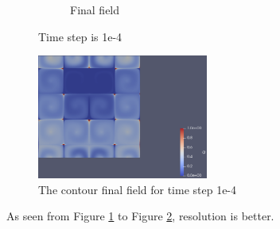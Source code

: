 \documentclass{article}
\begin{document}
\begin{figure}[hbt!]
\begin{subfigure}{0.4\textwidth}
        \caption{Final field}
  \end{subfigure}
  \caption{Time step is 1e-4}
  \label{t1m4_1} 
\end{figure}

\begin{figure}[hbt!]
    \centering
    \includegraphics[width=0.5\textwidth]{Figures/e-4 160x160/contour.png}
    \caption{The contour final field for time step 1e-4}
    \label{t1m4_2} 
\end{figure}

As seen from Figure \ref{t1m4_1} to Figure \ref{t1m4_2}, resolution is better.



\clearpage
\end{document}
